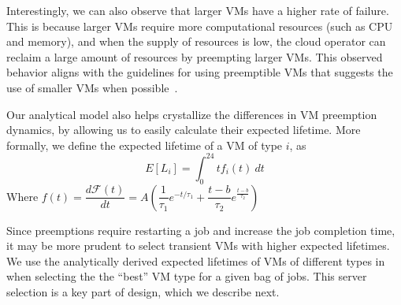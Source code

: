 Interestingly, we can also observe that larger VMs have a higher rate of failure.
This is because larger VMs require more computational resources (such as CPU and memory), and when the supply of resources is low, the cloud operator can reclaim a large amount of resources by preempting larger VMs.
This observed behavior aligns with the guidelines for using preemptible VMs that suggests the use of smaller VMs when possible~\cite{gcp-preempt-faq}. 


Our analytical model also helps crystallize the differences in VM preemption dynamics, by allowing us to easily calculate their expected lifetime. 
More formally, we define the expected lifetime of a VM of type $i$, as 
\begin{equation}
  \label{eq:expected-lifetime}
E[L_i] =  \int_{0}^{24} t {f_i}(t)~dt 
\end{equation}
Where $f(t) = \dfrac{d \mathscr{F}(t)} {dt} = A \left(\dfrac{1}{\tau_1}e^{-t/\tau_1} + \dfrac{t-b}{\tau_2}e^{\frac{t-b}{\tau_2}}\right) $ 

Since preemptions require restarting a job and increase the job completion time, it may be more prudent to select transient VMs with higher expected lifetimes. We use the analytically derived expected lifetimes of VMs of different types in \sysname when selecting the the ``best'' VM type for a given bag of jobs. This server selection is a key part of \sysname design, which we describe next. 







